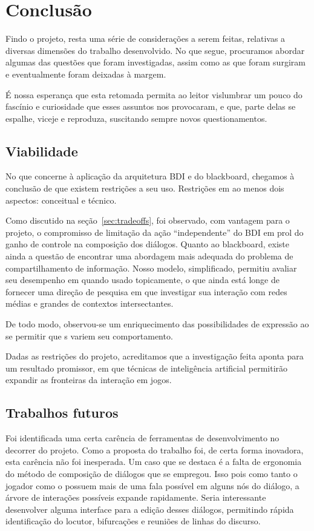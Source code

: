 \chapter{Conclusão}

Findo o projeto, resta uma série de considerações a serem feitas,
relativas a diversas dimensões do trabalho desenvolvido. No que
segue, procuramos abordar algumas das questões que foram investigadas,
assim como as que foram surgiram e eventualmente foram deixadas à
margem.


É nossa esperança que esta retomada permita ao leitor vislumbrar um
pouco do fascínio e curiosidade que esses assuntos nos provocaram, e
que, parte delas se espalhe, viceje e reproduza, suscitando sempre
novos questionamentos.

\section{Viabilidade}

No que concerne à aplicação da arquitetura BDI e do blackboard,
chegamos à conclusão de que existem restrições a seu uso. Restrições
em ao menos dois aspectos: conceitual e técnico.

Como discutido na seção~\ref{sec:tradeoffs}, foi observado, com
vantagem para o projeto, o compromisso de limitação da ação
``independente'' do BDI em prol do ganho de controle na composição dos
diálogos. Quanto ao blackboard, existe ainda a questão de encontrar
uma abordagem mais adequada do problema de compartilhamento de
informação. Nosso modelo, simplificado, permitiu avaliar seu
desempenho em quando usado topicamente, o que ainda está longe de
fornecer uma direção de pesquisa em que investigar sua interação com
redes médias e grandes de contextos intersectantes.

De todo modo, observou-se um enriquecimento das possibilidades de
expressão ao se permitir que \npc{}s variem seu comportamento.

Dadas as restrições do projeto, acreditamos que a investigação feita aponta para um resultado promissor, em que técnicas de inteligência artificial permitirão expandir as fronteiras da interação em jogos.

\section{Trabalhos futuros}

Foi identificada uma certa carência de ferramentas de desenvolvimento no decorrer do projeto.
Como a proposta do trabalho foi, de certa forma inovadora, esta carência não foi inesperada. Um caso que se destaca é a falta de ergonomia do método de composição de diálogos que se empregou. Isso pois como tanto o jogador como o \npc{} possuem mais de uma fala possível em alguns nós do diálogo, a árvore de interações possíveis expande rapidamente. Seria interessante desenvolver alguma interface para a  edição desses diálogos, permitindo rápida identificação do locutor, bifurcações e reuniões de linhas do discurso.


